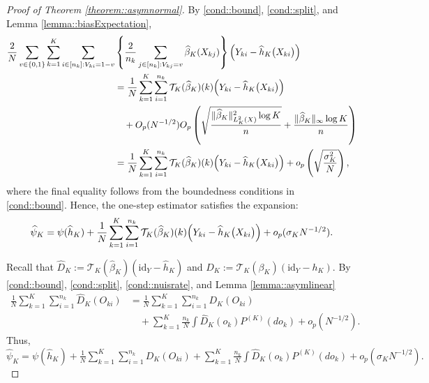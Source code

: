 \documentclass[11pt]{article}
\theoremstyle{plain}
\theoremstyle{definition}
\theoremstyle{remark}
\theoremstyle{definition}
\begin{document}
\begin{proof}[Proof of Theorem  \ref{theorem::asymnormal}]
By \ref{cond::bound}, \ref{cond::split},  and Lemma \ref{lemma::biasExpectation},
\begin{align*}
         \frac{2}{N} \sum_{v \in \{0,1\}} \sum_{k=1}^K \sum_{i \in [n_k]: V_{ki} = 1-v} & \left\{\frac{2}{n_k}  \sum_{j \in [n_k]:  V_{kj} = v} \widehat{\beta}_K(X_{kj})\right\}\Bigl(Y_{ki} - \widehat{h}_K\bigl(X_{ki}\bigr)\Bigr)\\
         &=  \frac{1}{N}   \sum_{k=1}^K \sum_{i=1}^{n_k}  \mathcal{T}_{K}(\widehat{\beta}_K)(k) \Bigl(Y_{ki} - \widehat{h}_K\bigl(X_{ki}\bigr)\Bigr) \\
         & \quad +  O_p(N^{-1/2}) O_p\left( \sqrt{\frac{\|\widehat{\beta}_K\|_{L^2_K(X)}^2 \log K}{n}} + \frac{\|\widehat{\beta}_K\|_{\infty} \log K}{n} \right)\\
          &=  \frac{1}{N}   \sum_{k=1}^K \sum_{i=1}^{n_k}  \mathcal{T}_{K}(\widehat{\beta}_K)(k) \Bigl(Y_{ki} - \widehat{h}_K\bigl(X_{ki}\bigr)\Bigr) + o_p\left(\sqrt{\frac{\sigma_K^2}{N}}\right), \\
\end{align*} 
where the final equality follows from the boundedness conditions in \ref{cond::bound}. Hence, the one-step estimator satisfies the expansion:
$$\widehat{\psi}_K = \psi(\widehat{h}_K) + \frac{1}{N}   \sum_{k=1}^K \sum_{i=1}^{n_k}  \mathcal{T}_{K}(\widehat{\beta}_K)(k) \Bigl(Y_{ki} - \widehat{h}_K\bigl(X_{ki}\bigr)\Bigr) + o_p(\sigma_K N^{-1/2}). $$


Recall that  $\widehat{D}_K :=   \mathcal{T}_{K}(\widehat{\beta}_K) (\text{id}_Y - \widehat{h}_K) $ and $D_K := \mathcal{T}_{K}(\beta_{K}) (\text{id}_Y - h_K)$. By \ref{cond::bound}, \ref{cond::split}, \ref{cond::nuisrate}, and Lemma \ref{lemma::asymlinear}
  \begin{align*}
      \frac{1}{N}   \sum_{k=1}^K \sum_{i=1}^{n_k} \widehat{D}_K(O_{ki})  &=    \frac{1}{N}   \sum_{k=1}^K \sum_{i=1}^{n_k} D_K(O_{ki}) \\
      & \quad +  \sum_{k=1}^K  \frac{n_k}{N} \int  \widehat{D}_K(o_k)  P^{(K)}(do_k) + o_p(N^{-1/2}).
  \end{align*}  
Thus, $\widehat{\psi}_K = \psi(\widehat{h}_K) +  \frac{1}{N}   \sum_{k=1}^K \sum_{i=1}^{n_k} D_K(O_{ki})  +  \sum_{k=1}^K  \frac{n_k}{N} \int  \widehat{D}_K(o_k)  P^{(K)}(do_k) + o_p(\sigma_K N^{-1/2}).$


\end{proof}
\end{document}
